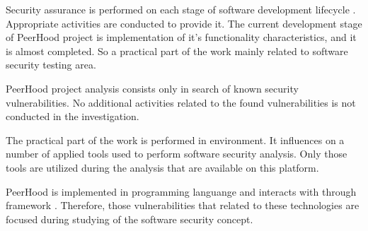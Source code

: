 %
Security assurance is performed on each stage of software development lifecycle . 
%
Appropriate activities are conducted to provide it. 
%
The current development stage of PeerHood project is implementation of it's functionality characteristics, and it is almost completed. 
%
So a practical part of the work mainly related to software security testing area. 

%
PeerHood project analysis consists only in search of known security vulnerabilities. 
%
No additional activities related to the found vulnerabilities is not conducted in the investigation. 

%
The practical part of the work is performed in   environment. 
%
It influences on a number of applied tools used to perform software security analysis. 
%
Only those tools are utilized during the analysis that are available on this platform. 

%
PeerHood is implemented in  programming languange  and interacts with  through  framework . 
%
Therefore, those vulnerabilities that related to these technologies are focused during studying of the software security concept. 